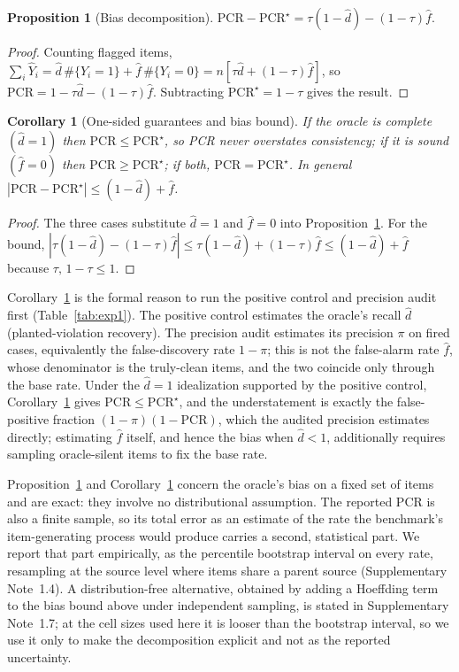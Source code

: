\documentclass[pdflatex,sn-nature]{sn-jnl}
\newtheorem{proposition}{Proposition}
\newtheorem{corollary}{Corollary}
\begin{document}
\begin{proposition}[Bias decomposition]\label{prop:bias}
$\mathrm{PCR}-\mathrm{PCR}^\star=\tau(1-\hat d)-(1-\tau)\hat f.$
\end{proposition}
\begin{proof}
Counting flagged items,
$\sum_i\hat Y_i=\hat d\,\#\{Y_i{=}1\}+\hat f\,\#\{Y_i{=}0\}=n[\tau\hat d+(1-\tau)\hat f]$,
so $\mathrm{PCR}=1-\tau\hat d-(1-\tau)\hat f$. Subtracting $\mathrm{PCR}^\star=1-\tau$
gives the result.
\end{proof}

\begin{corollary}[One-sided guarantees and bias bound]\label{cor:onesided}
If the oracle is complete $(\hat d=1)$ then $\mathrm{PCR}\le\mathrm{PCR}^\star$, so PCR
never overstates consistency; if it is sound $(\hat f=0)$ then
$\mathrm{PCR}\ge\mathrm{PCR}^\star$; if both, $\mathrm{PCR}=\mathrm{PCR}^\star$. In
general $|\mathrm{PCR}-\mathrm{PCR}^\star|\le(1-\hat d)+\hat f$.
\end{corollary}
\begin{proof}
The three cases substitute $\hat d=1$ and $\hat f=0$ into
Proposition~\ref{prop:bias}. For the bound,
$|\tau(1-\hat d)-(1-\tau)\hat f|\le\tau(1-\hat d)+(1-\tau)\hat f\le(1-\hat d)+\hat f$
because $\tau,\,1-\tau\le1$.
\end{proof}

\noindent Corollary~\ref{cor:onesided} is the formal reason to run the positive control
and precision audit first (Table~\ref{tab:exp1}). The positive control estimates the
oracle's recall $\hat d$ (planted-violation recovery). The precision audit estimates its
precision $\pi$ on fired cases, equivalently the false-discovery rate $1-\pi$; this is not
the false-alarm rate $\hat f$, whose denominator is the truly-clean items, and the two
coincide only through the base rate. Under the $\hat d=1$ idealization supported by the
positive control, Corollary~\ref{cor:onesided} gives $\mathrm{PCR}\le\mathrm{PCR}^\star$,
and the understatement is exactly the false-positive fraction $(1-\pi)(1-\mathrm{PCR})$, which the
audited precision estimates directly; estimating $\hat f$ itself, and hence the bias when
$\hat d<1$, additionally requires sampling oracle-silent items to fix the base rate.

Proposition~\ref{prop:bias} and Corollary~\ref{cor:onesided} concern the oracle's bias on
a fixed set of items and are exact: they involve no distributional assumption. The reported
PCR is also a finite sample, so its total error as an estimate of the rate the benchmark's
item-generating process would produce carries a second, statistical part. We report that part
empirically, as the percentile bootstrap interval on every rate, resampling at the source
level where items share a parent source (Supplementary Note~1.4). A distribution-free
alternative, obtained by adding a Hoeffding term to the bias bound above under independent
sampling, is stated in Supplementary Note~1.7; at the cell sizes used here it is looser than
the bootstrap interval, so we use it only to make the decomposition explicit and not as the
reported uncertainty.
\end{document}
